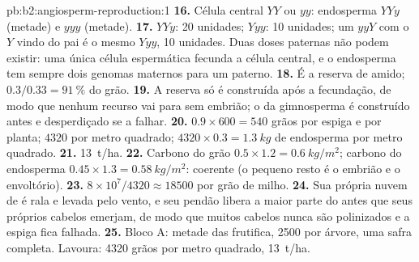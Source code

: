 \begin{solution}{pb:b2:angiosperm-reproduction:1}
\textbf{16.} Célula central $YY$ ou $yy$: endosperma $YYy$ (metade) e
$yyy$ (metade).
\textbf{17.} $YYy$: 20 unidades; $Yyy$: 10 unidades; um $yyY$ com o
$Y$ vindo do pai é o mesmo  $Yyy$, 10 unidades. Duas doses
paternas não podem existir: uma única célula espermática fecunda a
célula central, e o endosperma tem sempre dois genomas maternos para
um paterno.
\textbf{18.} É a reserva de amido; $0.3/0.33 = \qty{91}{\%}$ do grão.
\textbf{19.} A reserva só é construída após a fecundação, de modo que
nenhum recurso vai para  sem embrião; o  da
gimnosperma é construído antes e desperdiçado se a 
falhar.
\textbf{20.} $0.9\times 600 = 540$ grãos por espiga e por planta;
$4320$ por metro quadrado; $4320\times 0.3 = \qty{1.3}{kg}$ de
endosperma por metro quadrado.
\textbf{21.} \qty{13}{t/ha}.
\textbf{22.} Carbono do grão $0.5\times 1.2 = \qty{0.6}{kg/m^2}$;
carbono do endosperma $0.45\times 1.3 = \qty{0.58}{kg/m^2}$: coerente
(o pequeno resto é o embrião e o envoltório).
\textbf{23.} $8\times 10^{7}/4320 \approx \num{18500}$ 
por grão de milho.
\textbf{24.} Sua própria nuvem de  é rala e levada pelo vento, e
seu pendão libera a maior parte do  antes que seus próprios
cabelos emerjam, de modo que muitos cabelos nunca são polinizados e a
espiga fica falhada.
\textbf{25.} Bloco A: metade das  frutifica, 2500  por
árvore, uma safra completa. Lavoura: 4320 grãos por metro quadrado,
\qty{13}{t/ha}.
\end{solution}

